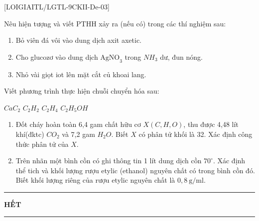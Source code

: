 

[LOIGIAITL/LGTL-9CKII-De-03]
\begin{bt}[$1{,}5$ điểm]
	Nêu hiện tượng và viết PTHH xảy ra (nếu có) trong các thí nghiệm sau:
	\begin{enumerate}
		\item Bỏ viên đá vôi vào dung dịch axit axetic.
		\item Cho glucozơ vào dung dịch $\mathrm{AgNO}_3$ trong $NH_3$ dư, đun nóng.
		\item Nhỏ vài giọt iot lên mặt cắt củ khoai lang.
	\end{enumerate}
	\loigiai{}
\end{bt}
\begin{bt}[$1{,}5$ điểm]
	Viết phương trình thực hiện chuỗi chuyển hóa sau:
	\begin{center}
		$CaC_2$ \MuiTen[(1)] $C_2H_2$ \MuiTen[(2)] $C_2H_4$ \MuiTen[(3)] $C_2H_5OH$
	\end{center}
	\loigiai{}
\end{bt}
\begin{bt}[2,0 điểm]
	\begin{enumerate}
		\item Đốt cháy hoàn toàn 6,4 gam chất hữu cơ $X(C, H, O)$, thu được 4,48 lít khí(đktc) $CO_2$ và 7,2 gam $H_2O$. Biết $X$ có phân tử khối là 32. Xác định công thức phân tử của $X$.
		\item Trên nhãn một bình cồn có ghi thông tin 1 lít dung dịch cồn $70^\circ$. Xác định thể tich và khối lượng rượu etylic (ethanol) nguyên chất có trong bình cồn đó. Biết khối lượng riêng của rượu etylic nguyên chất là $0,8\mathrm{~g} / \mathrm{ml}$.
	\end{enumerate}
	\loigiai{}
\end{bt}


\fileend

\begin{center}
	\rule[4pt]{2cm}{1pt}\large \textbf{HẾT}\rule[4pt]{2cm}{1pt}
\end{center}